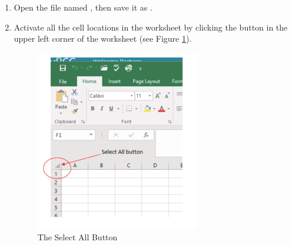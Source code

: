 \begin{enumbox}
	\begin{enumerate}
		\item Open the file named , then save it as .
		\item Activate all the cell locations in the  worksheet by clicking the  button in the upper left corner of the worksheet (see Figure \ref{01:fig53}).

		\begin{figure}[H]
			\centering
			\includegraphics[width=\maxwidth{.95\linewidth}]{gfx/ch01_fig53}
			\caption{The Select All Button}
			\label{01:fig53}
		\end{figure}


\end{enumerate}
\end{enumbox}
